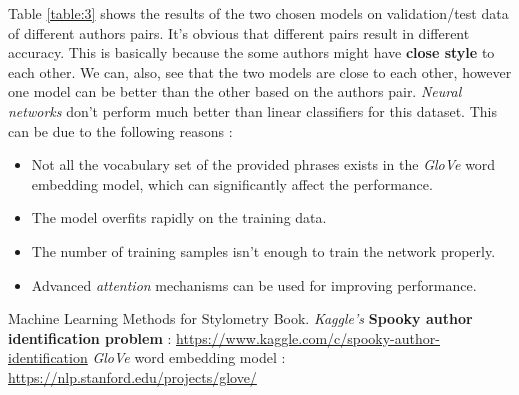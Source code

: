 \documentclass[letterpaper, 10 pt, conference]{ieeeconf}  %
\newcommand{\link}[1]{{\color{blue}\href{#1}{#1}}}
\begin{document}
Table \ref{table:3} shows the results of the two chosen models on validation/test data of different authors pairs. It's obvious that different pairs result in different accuracy. This is basically because the some authors might have \textbf{close style} to each other. We can, also, see that the two models are close to each other, however one model can be better than the other based on the authors pair. \emph{Neural networks} don't perform much better than linear classifiers for this dataset. This can be due to the following reasons :
\begin{itemize}
    \item Not all the vocabulary set of the provided phrases exists in the \emph{GloVe} word embedding model, which can significantly affect the performance.
    \item The model overfits rapidly on the training data.
    \item The number of training samples isn't enough to train the network properly.
    \item Advanced \emph{attention} mechanisms can be used for improving performance.
\end{itemize}


\begin{thebibliography}{99}
 Machine Learning Methods for Stylometry Book.
 \emph{Kaggle's} \textbf{Spooky author identification problem} : \link{https://www.kaggle.com/c/spooky-author-identification}
 \emph{GloVe} word embedding model : \link{https://nlp.stanford.edu/projects/glove/}
\end{thebibliography}

\end{document}
